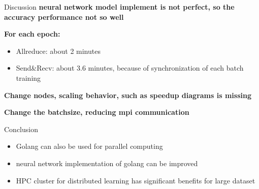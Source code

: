 \documentclass[presentation]{beamer}
\begin{document}
\begin{frame}[label={sec:org1ae9f9f}]{Discussion}
\textbf{neural network model implement is not perfect, so the accuracy performance not so well}

\textbf{For each epoch:}
\begin{itemize}
\item Allreduce: about 2 minutes
\item Send\&Recv: about 3.6 minutes, because of synchronization of each batch training
\end{itemize}


\textbf{Change nodes, scaling behavior, such as speedup diagrams is missing}

\textbf{Change the batchsize, reducing mpi communication}
\end{frame}

\begin{frame}[label={sec:org874bfce}]{Conclusion}
\begin{itemize}
\item Golang can also be used for parallel computing
\item neural network implementation of golang can be improved
\item HPC cluster for distributed learning has significant benefits for large dataset
\end{itemize}
\end{frame}
\end{document}
